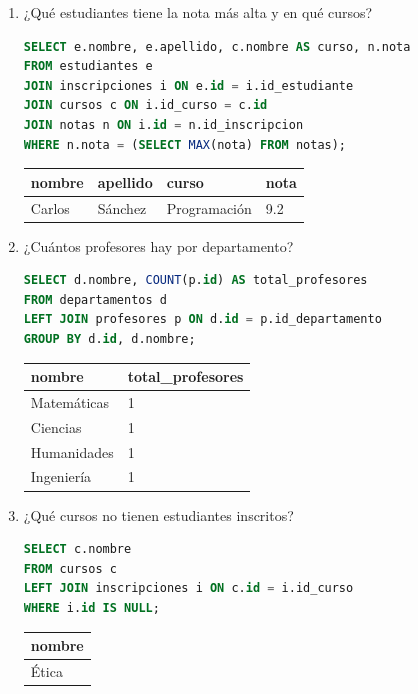 \documentclass[12pt,letterpaper]{article}
\begin{document}
\begin{enumerate}
    \item ¿Qué estudiantes tiene la nota más alta y en qué cursos?
\begin{lstlisting}[language=SQL, frame=single]
SELECT e.nombre, e.apellido, c.nombre AS curso, n.nota 
FROM estudiantes e 
JOIN inscripciones i ON e.id = i.id_estudiante 
JOIN cursos c ON i.id_curso = c.id 
JOIN notas n ON i.id = n.id_inscripcion 
WHERE n.nota = (SELECT MAX(nota) FROM notas);
\end{lstlisting}
    \begin{table}[H]
        \centering
        \begin{tabular}{|l|l|l|l|}
        \hline
        \textbf{nombre} & \textbf{apellido} & \textbf{curso} & \textbf{nota} \\ \hline
        Carlos & Sánchez & Programación & 9.2 \\ \hline
        \end{tabular}
    \end{table}

    \item ¿Cuántos profesores hay por departamento?
\begin{lstlisting}[language=SQL, frame=single]
SELECT d.nombre, COUNT(p.id) AS total_profesores 
FROM departamentos d 
LEFT JOIN profesores p ON d.id = p.id_departamento 
GROUP BY d.id, d.nombre;
\end{lstlisting}
    \begin{table}[H]
        \centering
        \begin{tabular}{|l|l|}
        \hline
        \textbf{nombre} & \textbf{total\_profesores} \\ \hline
        Matemáticas & 1 \\ 
        Ciencias & 1 \\ 
        Humanidades & 1 \\ 
        Ingeniería & 1 \\ \hline
        \end{tabular}
    \end{table}

    \item ¿Qué cursos no tienen estudiantes inscritos?
\begin{lstlisting}[language=SQL, frame=single]
SELECT c.nombre 
FROM cursos c 
LEFT JOIN inscripciones i ON c.id = i.id_curso 
WHERE i.id IS NULL;
\end{lstlisting}
    \begin{table}[H]
        \centering
        \begin{tabular}{|l|}
        \hline
        \textbf{nombre} \\ \hline
        Ética \\ \hline
        \end{tabular}
    \end{table}


\end{enumerate}
\end{document}
